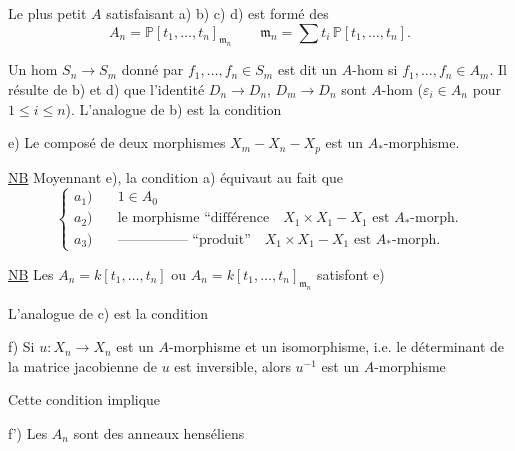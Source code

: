 Le plus petit $A$ satisfaisant a) b) c) d) est formé des
\[
 A_n=\mathbb P[t_1,\ldots,t_n]_{\mathfrak m_n}\qquad
 \mathfrak m_n=\sum t_i\,\mathbb P[t_1,\ldots,t_n].
\]

 Un hom $S_n\longrightarrow S_m$  donné par $f_1,\ldots,f_n\in S_m$ est dit un $A$-hom si $f_1,\ldots,f_n\in A_m$. Il résulte de b) et d) que l'identité $D_n\to D_n$,  $D_m\to D_n$ sont  $A$-hom ($\varepsilon_i\in A_n$ pour $1\leq i\leq n$). L'analogue de b)
est la condition

e) Le composé de deux morphismes $X_m-X_n-X_p$ est un $A_*$-morphisme.


\uline{NB} Moyennant  e), la condition a) équivaut au fait que
\[
\left\{\begin{aligned}
 a_1)&\quad 1\in A_0\\
 a_2)&\quad \text{le morphisme ``différence}\quad X_1\times X_1-X_1\text{ est } A_*\text{-morph.}\\
 a_3)&\quad \text{--------------- ``produit''}\quad X_1\times X_1-X_1\text{ est } A_*\text{-morph.}
\end{aligned}\right.
\]

\uline{NB} Les $A_n=k[t_1,\ldots,t_n]$ ou $A_n=k[t_1,\ldots,t_n]_{\mathfrak m_n}$ satisfont e)

L'analogue de c) est la condition

f) Si $u:X_n\longrightarrow X_n$ est un $A$-morphisme et un isomorphisme,  i.e. le déterminant  de la matrice jacobienne de $u$ est inversible, alors $u^{-1}$ est un $A$-morphisme

Cette condition implique 


f') Les $A_n$ sont des anneaux henséliens

